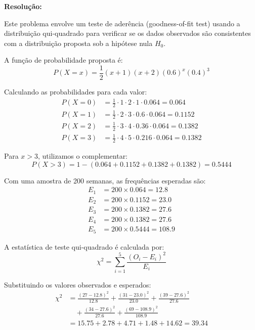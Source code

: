 \documentclass[a4paper,12pt]{article}
\begin{document}
\begin{enumerate}
    \begin{mdframed}[backgroundcolor=gray!10,linewidth=0pt,innertopmargin=10pt,innerbottommargin=10pt]
    \textbf{Resolução:}

    Este problema envolve um teste de aderência (goodness-of-fit test) usando a distribuição qui-quadrado para verificar se os dados observados são consistentes com a distribuição proposta sob a hipótese nula $H_0$.

    A função de probabilidade proposta é:
    \[
    P(X = x) = \frac{1}{2}(x + 1)(x + 2)(0.6)^x(0.4)^3
    \]

    Calculando as probabilidades para cada valor:
    \begin{align*}
    P(X = 0) &= \frac{1}{2} \cdot 1 \cdot 2 \cdot 1 \cdot 0.064 = 0.064 \\
    P(X = 1) &= \frac{1}{2} \cdot 2 \cdot 3 \cdot 0.6 \cdot 0.064 = 0.1152 \\
    P(X = 2) &= \frac{1}{2} \cdot 3 \cdot 4 \cdot 0.36 \cdot 0.064 = 0.1382 \\
    P(X = 3) &= \frac{1}{2} \cdot 4 \cdot 5 \cdot 0.216 \cdot 0.064 = 0.1382
    \end{align*}

    Para $x > 3$, utilizamos o complementar:
    \[
    P(X > 3) = 1 - (0.064 + 0.1152 + 0.1382 + 0.1382) = 0.5444
    \]

    Com uma amostra de 200 semanas, as frequências esperadas são:
    \begin{align*}
    E_1 &= 200 \times 0.064 = 12.8 \\
    E_2 &= 200 \times 0.1152 = 23.0 \\
    E_3 &= 200 \times 0.1382 = 27.6 \\
    E_4 &= 200 \times 0.1382 = 27.6 \\
    E_5 &= 200 \times 0.5444 = 108.9
    \end{align*}

    A estatística de teste qui-quadrado é calculada por:
    \[
    \chi^2 = \sum_{i=1}^5 \frac{(O_i - E_i)^2}{E_i}
    \]

    Substituindo os valores observados e esperados:
    \begin{align*}
    \chi^2 &= \frac{(27-12.8)^2}{12.8} + \frac{(31-23.0)^2}{23.0} + \frac{(39-27.6)^2}{27.6} \\
    &\quad + \frac{(34-27.6)^2}{27.6} + \frac{(69-108.9)^2}{108.9} \\
    &= 15.75 + 2.78 + 4.71 + 1.48 + 14.62 = 39.34
    \end{align*}


\end{mdframed}
\end{enumerate}
\end{document}
